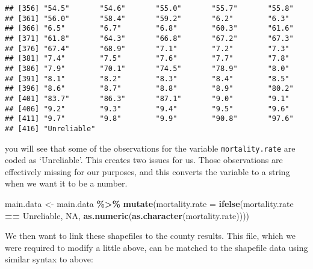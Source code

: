 \documentclass[
]{article}
\newenvironment{Shaded}{\begin{snugshade}}{\end{snugshade}}
\newcommand{\AttributeTok}[1]{\textcolor[rgb]{0.13,0.29,0.53}{#1}}
\newcommand{\ConstantTok}[1]{\textcolor[rgb]{0.56,0.35,0.01}{#1}}
\newcommand{\FunctionTok}[1]{\textcolor[rgb]{0.13,0.29,0.53}{\textbf{#1}}}
\newcommand{\NormalTok}[1]{#1}
\newcommand{\OtherTok}[1]{\textcolor[rgb]{0.56,0.35,0.01}{#1}}
\newcommand{\SpecialCharTok}[1]{\textcolor[rgb]{0.81,0.36,0.00}{\textbf{#1}}}
\newcommand{\StringTok}[1]{\textcolor[rgb]{0.31,0.60,0.02}{#1}}
\begin{document}
\begin{verbatim}
## [356] "54.5"       "54.6"       "55.0"       "55.7"       "55.8"      
## [361] "56.0"       "58.4"       "59.2"       "6.2"        "6.3"       
## [366] "6.5"        "6.7"        "6.8"        "60.3"       "61.6"      
## [371] "61.8"       "64.3"       "66.8"       "67.2"       "67.3"      
## [376] "67.4"       "68.9"       "7.1"        "7.2"        "7.3"       
## [381] "7.4"        "7.5"        "7.6"        "7.7"        "7.8"       
## [386] "7.9"        "70.1"       "74.5"       "78.9"       "8.0"       
## [391] "8.1"        "8.2"        "8.3"        "8.4"        "8.5"       
## [396] "8.6"        "8.7"        "8.8"        "8.9"        "80.2"      
## [401] "83.7"       "86.3"       "87.1"       "9.0"        "9.1"       
## [406] "9.2"        "9.3"        "9.4"        "9.5"        "9.6"       
## [411] "9.7"        "9.8"        "9.9"        "90.8"       "97.6"      
## [416] "Unreliable"
\end{verbatim}

you will see that some of the observations for the variable
\texttt{mortality.rate} are coded as `Unreliable'. This creates two
issues for us. Those observations are effectively missing for our
purposes, and this converts the variable to a string when we want it to
be a number.

\vspace{6mm}

\begin{Shaded}
\begin{Highlighting}[]
\NormalTok{main.data }\OtherTok{\textless{}{-}}\NormalTok{ main.data }\SpecialCharTok{\%\textgreater{}\%} 
  \FunctionTok{mutate}\NormalTok{(}\AttributeTok{mortality.rate =} \FunctionTok{ifelse}\NormalTok{(mortality.rate }\SpecialCharTok{==} \StringTok{\textquotesingle{}Unreliable\textquotesingle{}}\NormalTok{, }
                                 \ConstantTok{NA}\NormalTok{, }\FunctionTok{as.numeric}\NormalTok{(}\FunctionTok{as.character}\NormalTok{(mortality.rate))))}
\end{Highlighting}
\end{Shaded}

We then want to link these shapefiles to the county results. This file,
which we were required to modify a little above, can be matched to the
shapefile data using similar syntax to above:

\vspace{6mm}
\end{document}
